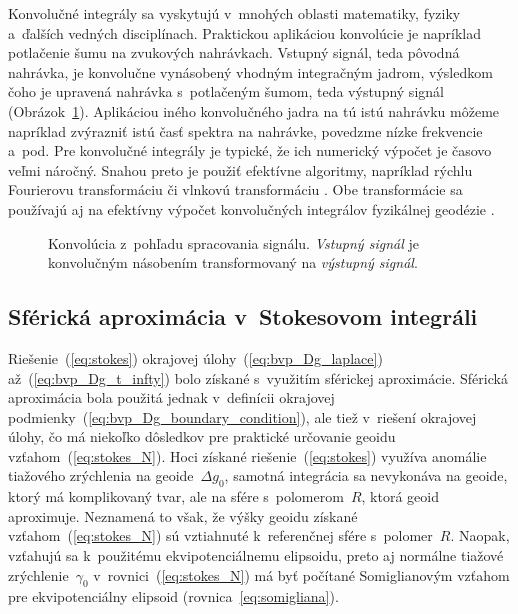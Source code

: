 \documentclass[a4paper, 12pt]{book}
\begin{document}
Konvolučné integrály sa vyskytujú v~mnohých oblasti matematiky, fyziky 
a~ďalších vedných disciplínach.  Praktickou aplikáciou konvolúcie je napríklad 
potlačenie šumu na zvukových nahrávkach.  Vstupný signál, teda pôvodná 
nahrávka, je konvolučne vynásobený vhodným integračným jadrom, výsledkom čoho 
je upravená nahrávka s~potlačeným šumom, teda výstupný signál 
(Obrázok~\ref{fig:convolution}).  Aplikáciou iného konvolučného jadra na tú 
istú nahrávku môžeme napríklad zvýrazniť istú časť spektra na nahrávke, 
povedzme nízke frekvencie a~pod.  Pre konvolučné integrály je typické, že ich 
numerický výpočet je časovo veľmi náročný.  Snahou preto je použiť efektívne 
algoritmy, napríklad rýchlu Fourierovu transformáciu 
\parencite{PressNumericalRecipes} či vlnkovú transformáciu 
\parencite{KellerWavelets}.  Obe transformácie sa používajú aj na efektívny 
výpočet konvolučných integrálov fyzikálnej geodézie \parencite[pozri 
napríklad][]{Forsberg1984,Freeden1998a,SansoGeoidDetermination}.

\begin{figure}[bt]
\centering

\caption{Konvolúcia z~pohľadu spracovania signálu.  \textit{Vstupný signál} je 
konvolučným násobením transformovaný na \textit{výstupný signál}.}
\label{fig:convolution}
\end{figure}


\subsection{Sférická aproximácia v~Stokesovom integráli}
\label{sec:stokes_spherical_approximation}

Riešenie~(\ref{eq:stokes}) okrajovej úlohy~(\ref{eq:bvp_Dg_laplace}) 
až~(\ref{eq:bvp_Dg_t_infty}) bolo získané s~využitím sférickej aproximácie.  
Sférická aproximácia bola použitá jednak v~definícii okrajovej 
podmienky~(\ref{eq:bvp_Dg_boundary_condition}), ale tiež v~riešení okrajovej 
úlohy, čo má niekoľko dôsledkov pre praktické určovanie geoidu 
vzťahom~(\ref{eq:stokes_N}).  Hoci získané riešenie~(\ref{eq:stokes}) využíva 
anomálie tiažového zrýchlenia na geoide~$\Delta g_0$, samotná integrácia sa 
nevykonáva na geoide, ktorý má komplikovaný tvar, ale na sfére s~polomerom~$R$, 
ktorá geoid aproximuje.  Neznamená to však, že výšky geoidu získané 
vzťahom~(\ref{eq:stokes_N}) sú vztiahnuté k~referenčnej sfére s~polomer~$R$.  
Naopak, vzťahujú sa k~použitému ekvipotenciálnemu elipsoidu, preto aj normálne 
tiažové zrýchlenie~$\gamma_0$ v~rovnici~(\ref{eq:stokes_N}) má byť počítané 
Somiglianovým vzťahom pre ekvipotenciálny elipsoid 
(rovnica~\ref{eq:somigliana}).
\end{document}
